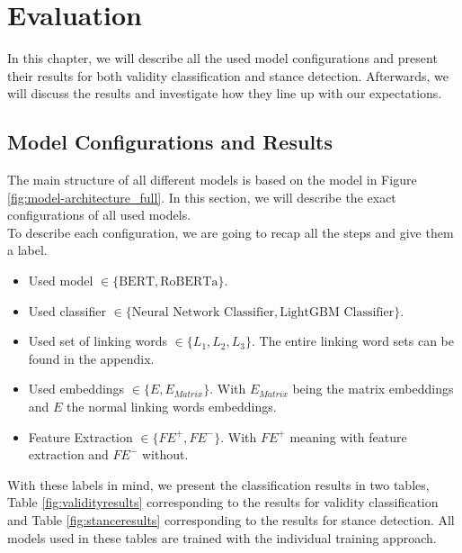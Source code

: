 \section{Evaluation}

In this chapter, we will describe all the used model configurations and present their results for both validity classification and stance detection. Afterwards, we will discuss the results and investigate how they line up with our expectations.

\subsection{Model Configurations and Results}

The main structure of all different models is based on the model in Figure \ref{fig:model-architecture_full}. In this section, we will describe the exact configurations of all used models. \\
To describe each configuration, we are going to recap all the steps and give them a label.
\begin{itemize}
	\item Used model $\in \{\text{BERT}, \text{RoBERTa}\}$.
	\item Used classifier $\in \{\text{Neural Network Classifier}, \text{LightGBM Classifier}\}$.
	\item Used set of linking words $\in \{L_1, L_2, L_3\}$. The entire linking word sets can be found in the appendix.
	\item Used embeddings $\in \{E, E_{Matrix}\}$. With $E_{Matrix}$ being the matrix embeddings and $E$ the normal linking words embeddings.
	\item Feature Extraction $\in \{\textit{FE}^+, \textit{FE}^-\}$. With $\textit{FE}^+$ meaning with feature extraction and $\textit{FE}^-$ without.
\end{itemize}
With these labels in mind, we present the classification results in two tables, Table \ref{fig:validityresults} corresponding to the results for validity classification and Table \ref{fig:stanceresults} corresponding to the results for stance detection. All models used in these tables are trained with the individual training approach.




